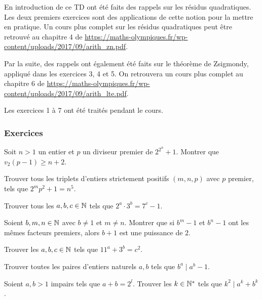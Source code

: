 En introduction de ce TD ont été faits des rappels sur les résidus quadratiques. Les deux premiers exercices sont des applications de cette notion pour la mettre en pratique. Un cours plus complet sur les résidus quadratiques peut être retrouvé au chapitre 4 de
\url{https://maths-olympiques.fr/wp-content/uploads/2017/09/arith_zn.pdf}.

Par la suite, des rappels ont également été faits sur le théorème de Zsigmondy, appliqué dans les exercices 3, 4 et 5. On retrouvera un cours plus complet au chapitre 6 de \url{https://maths-olympiques.fr/wp-content/uploads/2017/09/arith_lte.pdf}.

Les exercices 1 à 7 ont été traités pendant le cours.

\subsubsection{Exercices}

\begin{exo}
Soit $n>1$ un entier et $p$ un diviseur premier de $2^{2^n}+1$. Montrer que $v_2(p-1)\ge n+2$.
\end{exo}


\begin{exo}[Corée 2012]
Trouver tous les triplets d'entiers strictement positifs $(m,n,p)$ avec $p$ premier, tels que $2^mp^2+1=n^5$.
\end{exo}


\begin{exo}
Trouver tous les $a,b,c\in\mathbb N$ tels que $2^a\cdot3^b=7^c-1$.
\end{exo}


\begin{exo}
Soient $b,m,n\in\mathbb N$ avec $b\ne 1$ et $m\ne n$. Montrer que si $b^m-1$ et $b^n-1$ ont les mêmes facteurs premiers, alors $b+1$ est une puissance de $2$.
\end{exo}


\begin{exo}
Trouver les $a,b,c\in\mathbb N$ tels que $11^a+3^b=c^2$.
\end{exo}


\begin{exo}
Trouver toutes les paires d'entiers naturels $a,b$ tels que $b^a\mid a^b-1$.
\end{exo}


\begin{exo}
Soient $a,b>1$ impairs tels que $a+b=2^l$. Trouver les $k \in\mathbb N^*$ tels que $k^2\mid a^k+b^k$.
\end{exo}


